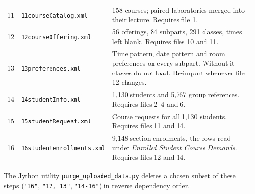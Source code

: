 \begin{longtable}{@{}rL{4.7cm}L{10.0cm}@{}}
11 & \texttt{11courseCatalog.xml}         & 158 courses; paired laboratories merged into their lecture. Requires file 1. \\
12 & \texttt{12courseOffering.xml}        & 56 offerings, 84 subparts, 291 classes, times left blank. Requires files 10 and 11. \\
13 & \texttt{13preferences.xml}           & Time pattern, date pattern and room preferences on every subpart. Without it classes do not load. Re-import whenever file 12 changes. \\
14 & \texttt{14studentInfo.xml}           & 1{,}130 students and 5{,}767 group references. Requires files 2--4 and 6. \\
15 & \texttt{15studentRequest.xml}        & Course requests for all 1{,}130 students. Requires files 11 and 14. \\
16 & \texttt{16studentenrollments.xml}    & 9{,}148 section enrolments, the rows read under \emph{Enrolled Student Course Demands}. Requires files 12 and 14. \\
\end{longtable}

\noindent The Jython utility \texttt{purge\_uploaded\_data.py} deletes a chosen subset of these
steps (\texttt{"16"}, \texttt{"12, 13"}, \texttt{"14-16"}) in reverse dependency order.
